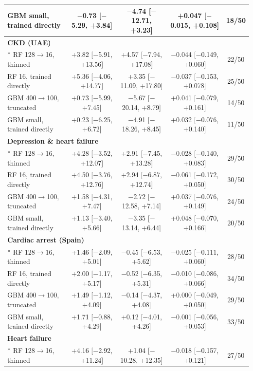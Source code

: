 {\begin{longtable}{lcccc}
\quad GBM small, trained directly & $-$0.73 [$-$5.29, +3.84] & $-$4.74 [$-$12.71, +3.23] & +0.047 [$-$0.015, +0.108] & 18/50 \\
\midrule
\multicolumn{5}{l}{\textbf{CKD (UAE)}} \\*
\quad RF 128$\rightarrow$16, thinned & +3.82 [$-$5.91, +13.56] & +4.57 [$-$7.94, +17.08] & $-$0.044 [$-$0.149, +0.060] & 22/50 \\
\quad RF 16, trained directly & +5.36 [$-$4.06, +14.77] & +3.35 [$-$11.09, +17.80] & $-$0.037 [$-$0.153, +0.078] & 25/50 \\
\quad GBM 400$\rightarrow$100, truncated & +0.73 [$-$5.99, +7.45] & $-$5.67 [$-$20.14, +8.79] & +0.041 [$-$0.079, +0.161] & 14/50 \\
\quad GBM small, trained directly & +0.23 [$-$6.25, +6.72] & $-$4.91 [$-$18.26, +8.45] & +0.032 [$-$0.076, +0.140] & 11/50 \\
\midrule
\multicolumn{5}{l}{\textbf{Depression \& heart failure}} \\*
\quad RF 128$\rightarrow$16, thinned & +4.28 [$-$3.52, +12.07] & +2.91 [$-$7.45, +13.28] & $-$0.028 [$-$0.140, +0.083] & 29/50 \\
\quad RF 16, trained directly & +4.50 [$-$3.76, +12.76] & +2.94 [$-$6.87, +12.74] & $-$0.061 [$-$0.172, +0.050] & 30/50 \\
\quad GBM 400$\rightarrow$100, truncated & +1.58 [$-$4.31, +7.47] & $-$2.72 [$-$12.58, +7.14] & +0.037 [$-$0.076, +0.149] & 24/50 \\
\quad GBM small, trained directly & +1.13 [$-$3.40, +5.66] & $-$3.35 [$-$13.14, +6.44] & +0.048 [$-$0.070, +0.166] & 20/50 \\
\midrule
\multicolumn{5}{l}{\textbf{Cardiac arrest (Spain)}} \\*
\quad RF 128$\rightarrow$16, thinned & +1.46 [$-$2.09, +5.01] & $-$0.45 [$-$6.53, +5.62] & $-$0.025 [$-$0.111, +0.060] & 28/50 \\
\quad RF 16, trained directly & +2.00 [$-$1.17, +5.17] & $-$0.52 [$-$6.35, +5.31] & $-$0.010 [$-$0.086, +0.066] & 34/50 \\
\quad GBM 400$\rightarrow$100, truncated & +1.49 [$-$1.12, +4.09] & $-$0.14 [$-$4.37, +4.08] & +0.000 [$-$0.049, +0.050] & 29/50 \\
\quad GBM small, trained directly & +1.71 [$-$0.88, +4.29] & +0.12 [$-$4.01, +4.26] & $-$0.001 [$-$0.056, +0.053] & 33/50 \\
\midrule
\multicolumn{5}{l}{\textbf{Heart failure}} \\*
\quad RF 128$\rightarrow$16, thinned & +4.16 [$-$2.92, +11.24] & +1.04 [$-$10.28, +12.35] & $-$0.018 [$-$0.157, +0.121] & 27/50 \\

\end{longtable}}
